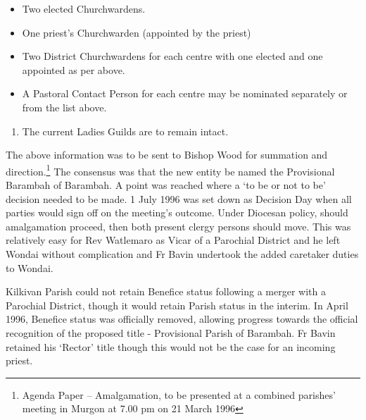 \begin{itemize}

\item

  Two elected Churchwardens.

\item

  One priest's Churchwarden (appointed by the priest)

\item

  Two District Churchwardens for each centre with one elected and one appointed as per above.

\item

  A Pastoral Contact Person for each centre may be nominated separately or from the list above.

\end{itemize}



\begin{enumerate}

\def\labelenumi{\arabic{enumi}.}

\setcounter{enumi}{5}

\item

  The current Ladies Guilds are to remain intact.

\end{enumerate}



The above information was to be sent to Bishop Wood for summation and direction.\footnote{Agenda Paper -- Amalgamation, to be presented at a combined parishes' meeting in Murgon at 7.00 pm on 21 March 1996} The consensus was that the new entity be named the Provisional Barambah of Barambah. A point was reached where a `to be or not to be' decision needed to be made. 1 July 1996 was set down as Decision Day when all parties would sign off on the meeting's outcome. Under Diocesan policy, should amalgamation proceed, then both present clergy persons should move. This was relatively easy for Rev Watlemaro as Vicar of a Parochial District and he left Wondai without complication and Fr Bavin undertook the added caretaker duties to Wondai.


Kilkivan Parish could not retain Benefice status following a merger with a Parochial District, though it would retain Parish status in the interim. In April 1996, Benefice status was officially removed, allowing progress towards the official recognition of the proposed title - Provisional Parish of Barambah. Fr Bavin retained his `Rector' title though this would not be the case for an incoming priest.



